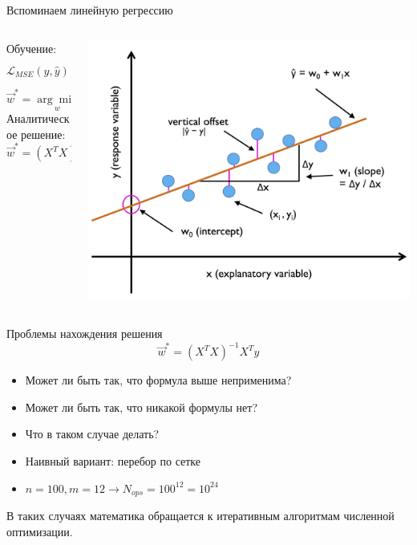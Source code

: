 \documentclass[aspectratio=169]{beamer}
\begin{document}
\begin{frame}{Вспоминаем линейную регрессию}
    \begin{columns}
        \begin{column}{.4\linewidth}
            Обучение:
            \[\mathcal{L}_{MSE}(y, \hat{y}) = \frac{1}{N} \sum_{i=1}^{N} {(y_i - \hat{y}_i)}^2\]
            \[ \vec{w}^* = \underset{w}{\arg\min} \mathcal{L} \]
            Аналитическое решение: \[ \vec{w}^* = {(X^T X)}^{-1} X^T y \]
        \end{column}
        \begin{column}{.5\linewidth}
            \centering
            \includegraphics[width=\linewidth]{figures/fig3.png}
        \end{column}
    \end{columns}
\end{frame}

\begin{frame}{Проблемы нахождения решения}
    \large{\[ \vec{w}^* = {(X^T X)}^{-1} X^T y \]}
    \begin{itemize}
        \item Может ли быть так, что формула выше неприменима?
        \item Может ли быть так, что никакой формулы нет?
        \item Что в таком случае делать?
        \pause
        \item Наивный вариант: перебор по сетке
        \item \(n = 100, m = 12 \rightarrow N_{ops} = 100^{12} = 10^{24}\)
    \end{itemize}
    \pause
    В таких случаях математика обращается к итеративным алгоритмам численной оптимизации.
\end{frame}
\end{document}
